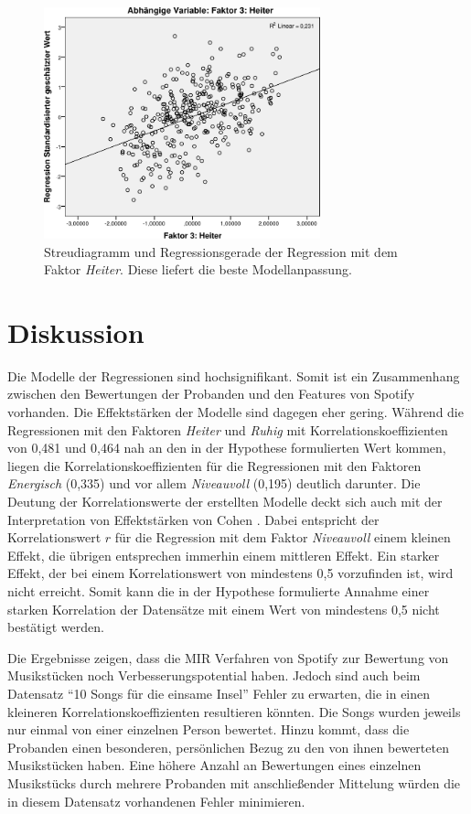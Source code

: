 \begin{figure}[hbt]
    \begin{center}
        \includegraphics[width=8cm]{images/StreudiagrammFak3.pdf}
    \end{center}
    \caption{Streudiagramm und Regressionsgerade der Regression mit dem Faktor \textit{Heiter}. Diese liefert die beste Modellanpassung.}
    \label{fig:Faktor3}
\end{figure}

\section*{Diskussion}
\label{sec:Diskussion}


Die Modelle der Regressionen sind hochsignifikant.
Somit ist ein Zusammenhang zwischen den Bewertungen der Probanden und den Features von Spotify vorhanden.
Die Effektstärken der Modelle sind dagegen eher gering. 
Während die Regressionen mit den Faktoren \textit{Heiter} und \textit{Ruhig} mit Korrelationskoeffizienten von 0,481 und 0,464 nah an den in der Hypothese formulierten Wert kommen, liegen die Korrelationskoeffizienten für die Regressionen mit den Faktoren \textit{Energisch} (0,335) und vor allem \textit{Niveauvoll} (0,195) deutlich darunter.
Die Deutung der Korrelationswerte der erstellten Modelle deckt sich auch mit der Interpretation von Effektstärken von Cohen \cite{cohen1988}.
Dabei entspricht der Korrelationswert $r$ für die Regression mit dem Faktor \textit{Niveauvoll} einem kleinen Effekt, die übrigen entsprechen immerhin einem mittleren Effekt.
Ein starker Effekt, der bei einem Korrelationswert von mindestens 0,5 vorzufinden ist, wird nicht erreicht.
Somit kann die in der Hypothese formulierte Annahme einer starken Korrelation der Datensätze mit einem Wert von mindestens 0,5 nicht bestätigt werden. 

Die Ergebnisse zeigen, dass die MIR Verfahren von Spotify zur Bewertung von Musikstücken noch Verbesserungspotential haben.
Jedoch sind auch beim Datensatz "`10 Songs für die einsame Insel"' Fehler zu erwarten, die in einen kleineren Korrelationskoeffizienten resultieren könnten.
Die Songs wurden jeweils nur einmal von einer einzelnen Person bewertet.
Hinzu kommt, dass die Probanden einen besonderen, persönlichen Bezug zu den von ihnen bewerteten Musikstücken haben.
Eine höhere Anzahl an Bewertungen eines einzelnen Musikstücks durch mehrere Probanden mit anschließender Mittelung würden die in diesem Datensatz vorhandenen Fehler minimieren.

